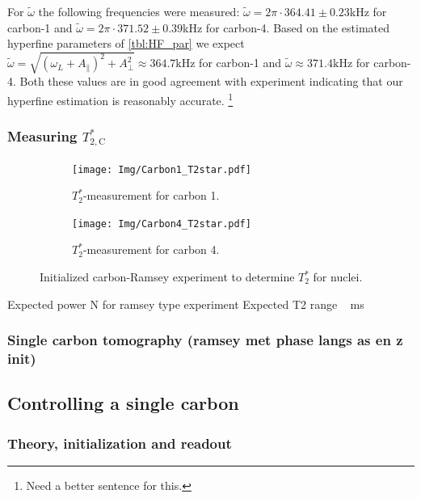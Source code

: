For $\tilde{\omega}$ the following frequencies were measured: $\tilde \omega= 2\pi\cdot 364.41 \pm 0.23$kHz for carbon-1
and $\tilde \omega = 2\pi\cdot 371.52 \pm 0.39 $kHz for carbon-4.
Based on the estimated hyperfine parameters of \cref{tbl:HF_par} we expect $\tilde\omega =   \sqrt{(\omega_L+A_\parallel) ^2 + A_\perp^2}  \approx 364.7\mathrm{kHz}$ for carbon-1 and $\tilde \omega \approx 371.4 \mathrm{kHz}$ for carbon-4.
Both these values are in good agreement with experiment indicating that our hyperfine estimation is reasonably accurate. \footnote{Need a better sentence for this. }

\subsubsection{Measuring $T_{2,\mathrm{C}}^* $}

\begin{figure}[htbp]
    \begin{subfigure}[t]{0.49\textwidth}\centering
    \texttt{[image: Img/Carbon1\_T2star.pdf]}
    \caption{$T_2^*$-measurement for carbon 1.}
    \label{fig:T2star_carbon1}
    \end{subfigure}
    \begin{subfigure}[t]{0.49\textwidth}\centering
        \texttt{[image: Img/Carbon4\_T2star.pdf]}
        \caption{$T_2^*$-measurement for carbon 4.   }
        \label{fig:T2star_carbon4}
    \end{subfigure}
    \caption{Initialized carbon-Ramsey experiment to determine $T_2^*$ for nuclei. }
    \label{fig:T2star_carbon}
\end{figure}

Expected power N for ramsey type experiment
Expected T2 range ~ ms


\subsubsection{Single carbon tomography (ramsey met phase langs as en z init) }


\subsection{Controlling a single carbon}

\subsubsection{Theory, initialization and readout}

